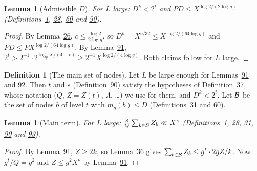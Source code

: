 \documentclass[11pt]{article}
\newcounter{hffc}
\theoremstyle{definition}\newtheorem{hffdef}[hffc]{Definition}
\theoremstyle{plain}\newtheorem{hfflem}[hffc]{Lemma}\newtheorem{hffthm}[hffc]{Theorem}
\theoremstyle{remark}\newtheorem{hffrem}[hffc]{Remark}
\newcommand{\hffcost}{}
\newcommand{\setcost}[1]{\renewcommand{\hffcost}{#1}}
\begin{document}
\begin{hfflem}[Admissible $D$]\label{L:admD}
For $L$ large: $D^k<2^t$ and $PD\le X^{\log2/(2\log g)}$ (Definitions~\hyperref[D:conv]{1}, \hyperref[D:pal]{28}, \hyperref[D:gpart]{60} and \hyperref[D:par]{90}).
\par\nopagebreak{}
\end{hfflem}
\begin{proof}\setcost{length 142/300}By Lemma~\hyperref[L:saving]{26}, $c\le\frac{\log2}{2\log g}$, so $D^k=X^{c/32}\le X^{\log2/(64\log g)}$ and $PD\le PX^{\log2/(64\log g)}$. By Lemma~\hyperref[L:adm]{91}, $2^t>2^{-1}\cdot2^{\log_gX/(4-c)}\ge2^{-1}X^{\log2/(4\log g)}$. Both claims follow for $L$ large.
\end{proof}

\begin{hffdef}[The main set of nodes]\label{D:setB}
Let $L$ be large enough for Lemmas~\hyperref[L:adm]{91} and \hyperref[L:admD]{92}. Then $t$ and $s$ (Definition~\hyperref[D:par]{90}) satisfy the hypotheses of Definition~\hyperref[D:phase]{37}, whose notation ($Q$, $Z=Z(t)$, $\Lambda$, \dots) we use for them, and $D^k<2^t$. Let $\mathcal{B}$ be the set of nodes $b$ of level $t$ with $m_g(b)\le D$ (Definitions~\hyperref[D:node]{31} and \hyperref[D:gpart]{60}).
\par\nopagebreak{}
\end{hffdef}

\begin{hfflem}[Main term]\label{L:main}
For $L$ large: $\frac8Q\sum_{b\in\mathcal{B}}Z_b\ll X^\nu$ (Definitions~\hyperref[D:conv]{1}, \hyperref[D:pal]{28}, \hyperref[D:node]{31}, \hyperref[D:par]{90} and \hyperref[D:setB]{93}).
\par\nopagebreak{}
\end{hfflem}
\begin{proof}\setcost{length 73/300}By Lemma~\hyperref[L:adm]{91}, $Z\ge2k$, so Lemma~\hyperref[L:nonempty]{36} gives $\sum_{b\in\mathcal{B}}Z_b\le g^t\cdot2gZ/k$. Now $g^t/Q=g^2$ and $Z\le g^2X^\nu$ by Lemma~\hyperref[L:adm]{91}.
\end{proof}
\end{document}
